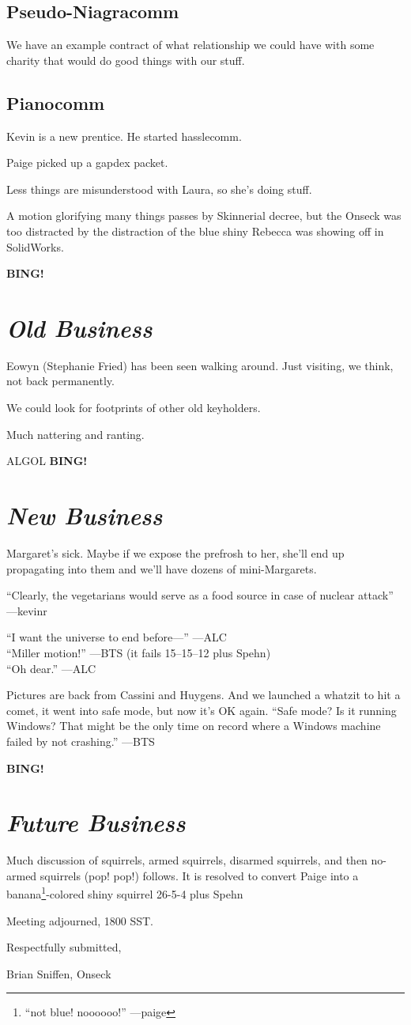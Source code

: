 \documentclass[10pt]{article}
\newcommand{\bing}{{\bf BING!} }
\newcommand{\goto}[1]{\bing \vskip 12pt \section*{{\em{#1}}}}
\newcommand{\ps}{ plus Spehn\xspace}
\begin{document}
\subsection*{Pseudo-Niagracomm}
We have an example contract of what relationship we could have with
some charity that would do good things with our stuff.

\subsection*{Pianocomm}
Kevin is a new prentice.  He started hasslecomm.

Paige picked up a gapdex packet.

Less things are misunderstood with Laura, so she's doing stuff.

A motion glorifying many things passes by Skinnerial decree, but the
Onseck was too distracted by the distraction of the blue shiny Rebecca
was showing off in SolidWorks.

\goto{Old Business}
Eowyn (Stephanie Fried) has been seen walking around.  Just visiting,
we think, not back permanently.

We could look for footprints of other old keyholders.

Much nattering and ranting.

ALGOL
\goto{New Business}

Margaret's sick.  Maybe if we expose the prefrosh to her, she'll end
up propagating into them and we'll have dozens of mini-Margarets.

``Clearly, the vegetarians would serve as a food source in case of
nuclear attack'' ---kevinr

``I want the universe to end before---'' ---ALC\\
``Miller motion!'' ---BTS (it fails 15--15--12\ps)\\
``Oh dear.'' ---ALC

Pictures are back from Cassini and Huygens.  And we launched a whatzit
to hit a comet, it went into safe mode, but now it's OK again.  ``Safe
mode?  Is it running Windows?  That might be the only time on record
where a Windows machine failed by not crashing.'' ---BTS

\goto{Future Business}

Much discussion of squirrels, armed squirrels, disarmed squirrels, and
then no-armed squirrels (pop!  pop!) follows.  It is resolved to
convert Paige into a banana\footnote{``not blue!  noooooo!''
  ---paige}-colored shiny squirrel 26-5-4\ps

\vspace{12pt}

\noindent
Meeting adjourned, 1800 SST.

\vspace{18pt}

\centerline{Respectfully submitted,}
\centerline{Brian Sniffen, Onseck}
\end{document}

